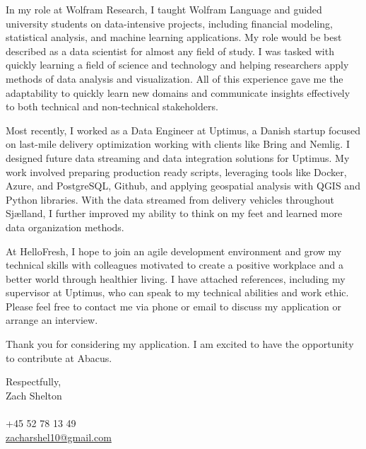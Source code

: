 \documentclass[11pt,a4]{article}
\begin{document}
In my role at Wolfram Research, I taught Wolfram Language and guided university students on data-intensive projects, including financial modeling, statistical analysis, and machine learning applications. My role would be best described as a data scientist for almost any field of study. I was tasked with quickly learning a field of science and technology and helping researchers apply methods of data analysis and visualization. All of this experience gave me the adaptability to quickly learn new domains and communicate insights effectively to both technical and non-technical stakeholders.

Most recently, I worked as a Data Engineer at Uptimus, a Danish startup focused on last-mile delivery optimization working with clients like Bring and Nemlig. I designed future data streaming and data integration solutions for Uptimus. My work involved preparing production ready scripts, leveraging tools like Docker, Azure, and PostgreSQL, Github, and applying geospatial analysis with QGIS and Python libraries. With the data streamed from delivery vehicles throughout Sjælland, I further improved my ability to think on my feet and learned more data organization methods.

At HelloFresh, I hope to join an agile development environment and grow my technical skills with colleagues motivated to create a positive workplace and a better world through healthier living. I have attached references, including my supervisor at Uptimus, who can speak to my technical abilities and work ethic. Please feel free to contact me via phone or email to discuss my application or arrange an interview.

Thank you for considering my application. I am excited to have the opportunity to contribute at Abacus.

\vspace{0.5cm}
\raggedright
Respectfully, \\ Zach Shelton \\ \\ +45 52 78 13 49 \\ 
\href{mailto:zshelton1997@gmail.com}{zacharshel10@gmail.com} 
\end{document}
